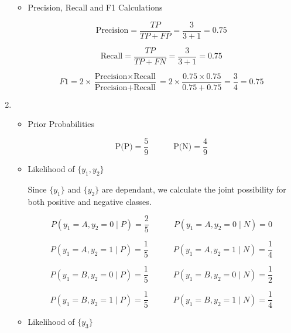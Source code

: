 \documentclass[12pt]{article}
\begin{document}
\begin{enumerate}[leftmargin=\labelsep, label=\textbf{\arabic*.)}]
\begin{itemize}
                    \vspace{0.5em}

              \item Precision, Recall and F1 Calculations

                    \[
                        \text{Precision} = \frac{TP}{TP + FP} = \frac{3}{3 + 1} = 0.75
                    \]

                    \[
                        \text{Recall} = \frac{TP}{TP + FN} = \frac{3}{3 + 1} = 0.75
                    \]

                    \[
                        F1 = 2 \times \frac{\text{Precision} \times \text{Recall}}{\text{Precision} + \text{Recall}} = 2 \times \frac{0.75 \times 0.75}{0.75 + 0.75} = \frac{3}{4} = 0.75
                    \]

          \end{itemize}

    \item \begin{itemize}
              \item Prior Probabilities

                    \[
                        \text{P(P)} = \frac{5}{9} \quad \quad \quad \text{P(N)} = \frac{4}{9}
                    \]

              \item Likelihood of $\{y_1, y_2\}$

                    Since $\{y_1\}$ and $\{y_2\}$ are dependant, we calculate the joint possibility for both positive and negative classes.

                    \[
                        P(y_1 = A, y_2 = 0 \mid P) = \frac{2}{5} \quad \quad \quad P(y_1 = A, y_2 = 0 \mid N) = 0
                    \]

                    \[
                        P(y_1 = A, y_2 = 1 \mid P) = \frac{1}{5} \quad \quad \quad P(y_1 = A, y_2 = 1 \mid N) = \frac{1}{4}
                    \]

                    \[
                        P(y_1 = B, y_2 = 0 \mid P) = \frac{1}{5} \quad \quad \quad P(y_1 = B, y_2 = 0 \mid N) = \frac{1}{2}
                    \]

                    \[
                        P(y_1 = B, y_2 = 1 \mid P) = \frac{1}{5} \quad \quad \quad P(y_1 = B, y_2 = 1 \mid N) = \frac{1}{4}
                    \]

              \item Likelihood of $\{y_3\}$


\end{itemize}
\end{enumerate}
\end{document}
